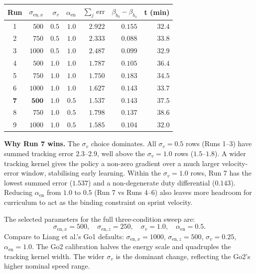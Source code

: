 \documentclass[a4paper,11pt]{article}
\begin{document}
    \begin{center}
    \begin{tabular}{@{}c r r r r r r@{}}
    \toprule
    \textbf{Run} & $\sigma_{\mathrm{en},x}$ & $\sigma_v$ & $\alpha_{\mathrm{en}}$ & $\sum_j\,\mathrm{err}$ & $\beta_{b_0}\!-\!\beta_{b_4}$ & t (min) \\
    \midrule
    1 & $500$  & $0.5$ & $1.0$ & $2.922$ & $0.155$ & $32.4$ \\
    2 & $750$  & $0.5$ & $1.0$ & $2.333$ & $0.088$ & $33.8$ \\
    3 & $1000$ & $0.5$ & $1.0$ & $2.487$ & $0.099$ & $32.9$ \\
    4 & $500$  & $1.0$ & $1.0$ & $1.787$ & $0.105$ & $36.4$ \\
    5 & $750$  & $1.0$ & $1.0$ & $1.750$ & $0.183$ & $34.5$ \\
    6 & $1000$ & $1.0$ & $1.0$ & $1.627$ & $0.143$ & $33.7$ \\
    \textbf{7} & $\mathbf{500}$ & $\mathbf{1.0}$ & $\mathbf{0.5}$ & $\mathbf{1.537}$ & $\mathbf{0.143}$ & $\mathbf{37.5}$ \\
    8 & $750$  & $1.0$ & $0.5$ & $1.798$ & $0.137$ & $38.6$ \\
    9 & $1000$ & $1.0$ & $0.5$ & $1.585$ & $0.104$ & $32.0$ \\
    \bottomrule
    \end{tabular}
    \label{tab:step2}
    \end{center}

    \textbf{Why Run 7 wins.} The $\sigma_v$ choice dominates. All $\sigma_v = 0.5$ rows (Runs 1--3) have summed tracking error $2.3$--$2.9$, well above the $\sigma_v = 1.0$ rows ($1.5$--$1.8$). A wider tracking kernel gives the policy a non-zero gradient over a much larger velocity-error window, stabilising early learning. Within the $\sigma_v = 1.0$ rows, Run 7 has the lowest summed error ($1.537$) and a non-degenerate duty differential ($0.143$). Reducing $\alpha_{\mathrm{en}}$ from $1.0$ to $0.5$ (Run 7 vs Runs 4--6) also leaves more headroom for curriculum to act as the binding constraint on sprint velocity.

    The selected parameters for the full three-condition sweep are:
    \begin{equation}
    \sigma_{\mathrm{en},x} = 500, \quad \sigma_{\mathrm{en},z} = 250, \quad \sigma_v = 1.0, \quad \alpha_{\mathrm{en}} = 0.5.
    \label{eq:selected}
    \end{equation}
    Compare to Liang et al.'s Go1 defaults: $\sigma_{\mathrm{en},x} = 1000$, $\sigma_{\mathrm{en},z} = 500$, $\sigma_v = 0.25$, $\alpha_{\mathrm{en}} = 1.0$. The Go2 calibration halves the energy scale and quadruples the tracking kernel width. The wider $\sigma_v$ is the dominant change, reflecting the Go2's higher nominal speed range.
\end{document}
